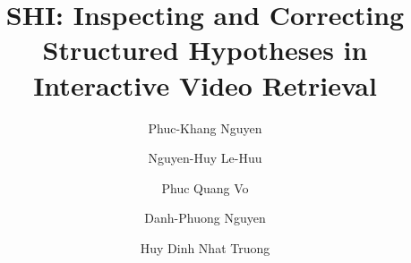 \documentclass[runningheads]{llncs}
\begin{document}
\title{SHI: Inspecting and Correcting Structured Hypotheses in Interactive Video Retrieval}
\author{Phuc-Khang Nguyen \and
Nguyen-Huy Le-Huu \and
Phuc Quang Vo \and
Danh-Phuong Nguyen \and
Huy Dinh Nhat Truong}
\maketitle








% 

\makeatletter
\renewenvironment{thebibliography}[1]
     {\section*{\refname}
      \def\@biblabel##1{##1.}
      \fontsize{8.5pt}{10.2pt}\selectfont
      \list{\@biblabel{\@arabic\c@enumiv}}%
           {\settowidth\labelwidth{\@biblabel{#1}}%
            \leftmargin\labelwidth
            \advance\leftmargin\labelsep
            \setlength{\itemsep}{-2.5pt}%
            \setlength{\parsep}{0pt}%
            \usecounter{enumiv}%
            \let\p@enumiv\@empty
            \renewcommand\theenumiv{\@arabic\c@enumiv}}%
      \renewcommand\newblock{\hskip .11em \@plus.33em \@minus.07em}%
      \sloppy\clubpenalty4000\widowpenalty4000%
      \sfcode`\.=\@m}
     {\def\@noitemerr
       {\@latex@warning{Empty `thebibliography' environment}}%
      \endlist}
\makeatother



\end{document}
